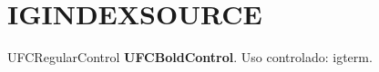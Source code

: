 \documentclass{abntexto-ufc}
\begin{document}
\textual
\section{IGINDEXSOURCE}
UFCRegularControl \textbf{UFCBoldControl}.
Uso controlado: \gls{igterm}.

\ufcPrintGlossary
\ufcPrintIndex
\end{document}
